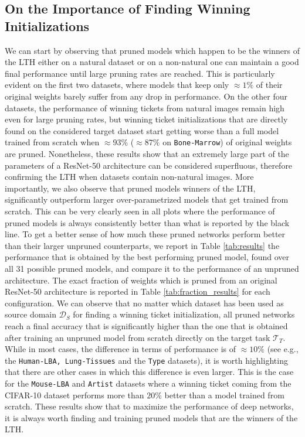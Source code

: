 \subsection{On the Importance of Finding Winning Initializations}
We can start by observing that pruned models which happen to be the winners of the LTH either on a natural dataset or on a non-natural one can maintain a good final performance until large pruning rates are reached. This is particularly evident on the first two datasets, where models that keep only $\approx 1\%$ of their original weights barely suffer from any drop in performance. %
On the other four datasets, the performance of winning tickets from natural images remain high even for large pruning rates, but winning ticket initializations that are directly found on the considered target dataset start getting worse than a full model trained from scratch when $\approx 93\%$ ($\approx 87\%$ on \texttt{Bone-Marrow}) of original weights are pruned. Nonetheless, these results show that an extremely large part of the parameters of a ResNet-50 architecture can be considered superfluous, therefore confirming the LTH when datasets contain non-natural images. More importantly, we also observe that pruned models winners of the LTH, significantly outperform larger over-parametrized models that get trained from scratch. This can be very clearly seen in all plots where the performance of pruned models is always consistently better than what is reported by the black line. To get a better sense of how much these pruned networks perform better than their larger unpruned counterparts, we report in Table \ref{tab:results} the performance that is obtained by the best performing pruned model, found over all 31 possible pruned models, and compare it to the performance of an unpruned architecture. The exact fraction of weights which is pruned from an original ResNet-50 architecture is reported in Table \ref{tab:fraction_results} for each configuration. We can observe that no matter which dataset has been used as source domain $\mathcal{D}_S$ for finding a winning ticket initialization, all pruned networks reach a final accuracy that is significantly higher than the one that is obtained after training an unpruned model from scratch directly on the target task $\mathcal{T}_T$. While in most cases, the difference in terms of performance is of $\approx 10\%$ (see e.g., the \texttt{Human-LBA, Lung-Tissues} and the \texttt{Type} datasets), it is worth highlighting that there are other cases in which this difference is even larger. This is the case for the \texttt{Mouse-LBA} and \texttt{Artist}  datasets where a winning ticket coming from the CIFAR-10 dataset performs more than $20\%$ better than a model trained from scratch. These results show that to maximize the performance of deep networks, it is always worth finding and training pruned models that are the winners of the LTH.

